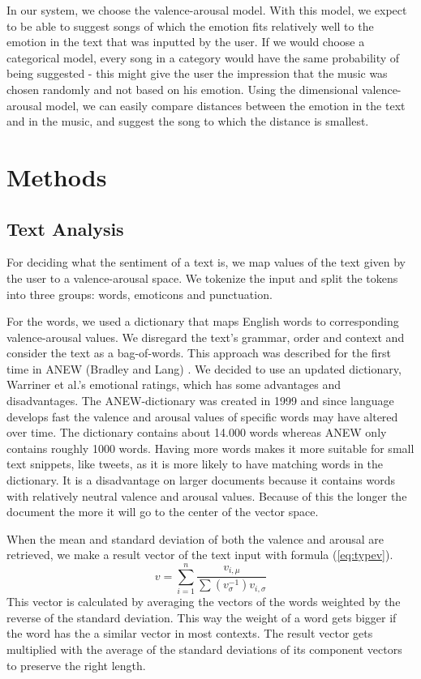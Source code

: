 \documentclass[10pt,journal,compsoc]{IEEEtran}
\begin{document}
In our system, we choose the valence-arousal model. With this model, we expect to be able to suggest songs of which the emotion fits relatively well to the emotion in the text that was inputted by the user. If we would choose a categorical model, every song in a category would have the same probability of being suggested - this might give the user the impression that the music was chosen randomly and not based on his emotion. Using the dimensional valence-arousal model, we can easily compare distances between the emotion in the text and in the music, and suggest the song to which the distance is smallest.

\section{Methods}

\subsection{Text Analysis}
For deciding what the sentiment of a text is, we map values of the text given by the user to a valence-arousal space. We tokenize the input and split the tokens into three groups: words, emoticons and punctuation. 

For the words, we used a dictionary that maps English words to corresponding valence-arousal values. We disregard the text's grammar, order and context and consider the text as a bag-of-words. This approach was described for the first time in ANEW (Bradley and Lang) \cite{Bradley}. We decided to use an updated dictionary, Warriner et al.\cite{Warriner}'s emotional ratings, which has some advantages and disadvantages. The ANEW-dictionary was created in 1999 and since language develops fast the valence and arousal values of specific words may have altered over time. The dictionary contains about 14.000 words whereas ANEW only contains roughly 1000 words. Having more words makes it more suitable for small text snippets, like tweets, as it is more likely to have matching words in the dictionary. It is a disadvantage on larger documents because it contains words with relatively neutral valence and arousal values. Because of this the longer the document the more it will go to the center of the vector space.

When the mean and standard deviation of both the valence and arousal are retrieved, we make a result vector of the text input with formula (\ref{eq:typev}). 
\begin{equation}
	v = \sum\limits_{i=1}^n\frac{v_{i,\mu}}{\sum (v_{\sigma}^{-1})v_{i,\sigma}}
	\label{eq:typev}
\end{equation}
This vector is calculated by averaging the vectors of the words weighted by the reverse of the standard deviation. This way the weight of a word gets bigger if the word has the a similar vector in most contexts. The result vector gets multiplied with the average of the standard deviations of its component vectors to preserve the right length.
\end{document}
